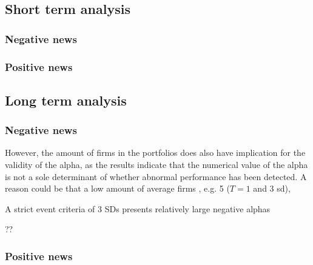 \subsection{Short term analysis}

\subsubsection{Negative news}

\subsubsection{Positive news}

\subsection{Long term analysis}



\subsubsection{Negative news}


  However, the amount of firms in the portfolios does also have implication for the validity of the alpha, as the results indicate that the numerical value of the alpha is not a sole determinant of whether abnormal performance has been detected. A reason could be that a low amount of average firms , e.g. 5 ($T = 1$ and 3 sd), 

A strict event criteria of 3 SDs presents relatively large negative alphas

  ??

  \subsubsection{Positive news}
